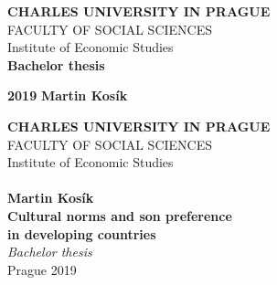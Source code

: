 \pagestyle{empty}
\begin{center}
\textbf{\LARGE{CHARLES UNIVERSITY IN PRAGUE}}\\
\Large{FACULTY OF SOCIAL SCIENCES}\\
\large{Institute of Economic Studies} \\
\vspace{60mm} \textbf{\LARGE{Bachelor thesis}}\\
\end{center}
\vspace{100mm} \textbf{\LARGE{2019}}  \hspace {65mm} \textbf{\LARGE{Martin Kosík}}\\
\vspace{11mm}
\newpage

\pagestyle{empty}
\begin{center}
\textbf{\LARGE{CHARLES UNIVERSITY IN PRAGUE}}\\
\Large{FACULTY OF SOCIAL SCIENCES}\\
\large{Institute of Economic Studies} \\
\\  %
\textbf{\large{Martin Kosík
}} \\
\vspace{10mm} \textbf{\LARGE{Cultural norms and son preference }\\
 \LARGE{in developing countries}}\\
\vspace{11mm} \textit{\Large{Bachelor thesis}} \\
\vspace{40mm} \large{Prague 2019}

\end{center}
\newpage


